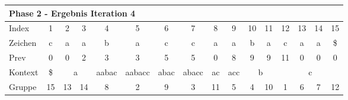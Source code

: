 \begin{table}[H]
\centering
\begin{adjustbox}{max width=\textwidth}
\centering
\begin{tabular}{lccccccccccccccc}
\multicolumn{16}{l}{Phase 2 - Ergebnis Iteration 4}                                                                                                                                                                                                                                                                                                                                                                       \\ \hline
\multicolumn{1}{l|}{Index}   & 1                       & 2  & 3                       & 4                                              & 5                                              & 6                         & 7                                              & 8                       & 9                                              & 10 & 11                      & 12 & 13                        & 14 & 15 \\
\multicolumn{1}{l|}{Zeichen} & c                       & a  & a                       & b                                              & a                                              & c                         & c                                              & a                       & a                                              & b  & a                       & c  & a                         & a  & \$ \\
\multicolumn{1}{l|}{Prev}    & 0                       & 0  & 2                       & 3                                              & 3                                              & 5                         & 5                                              & 0                       & 8                                              & 9  & 9                       & 11 & 0                         & 0  & 0  \\ \hline
\multicolumn{1}{l|}{Kontext} & \multicolumn{1}{c|}{\$} & \multicolumn{2}{c|}{a}       & \multicolumn{1}{c|}{aabac}                     & \multicolumn{1}{c|}{aabacc}                    & \multicolumn{1}{c|}{abac} & \multicolumn{1}{c|}{abacc}                     & \multicolumn{1}{c|}{ac} & \multicolumn{1}{c|}{acc}                       & \multicolumn{2}{c|}{b}       & \multicolumn{4}{c}{c}                    \\
\multicolumn{1}{l|}{Gruppe}  & \multicolumn{1}{c|}{15} & 13 & \multicolumn{1}{c|}{14} & \multicolumn{1}{c|}{8}                         & \multicolumn{1}{c|}{2}                         & \multicolumn{1}{c|}{9}    & \multicolumn{1}{c|}{3}                         & \multicolumn{1}{c|}{11} & \multicolumn{1}{c|}{5}                         & 4  & \multicolumn{1}{c|}{10} & 1  & 6                         & 7  & 12 \\

\end{tabular}
\end{adjustbox}
\end{table}
